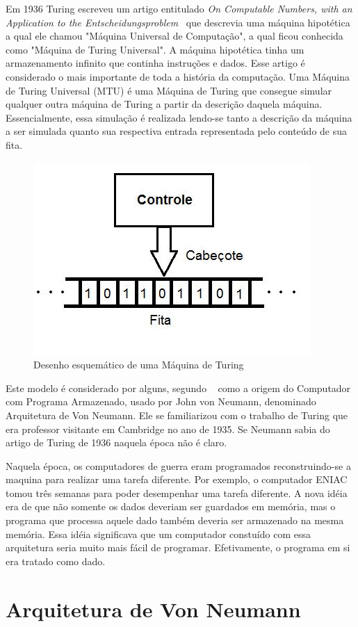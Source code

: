 \documentclass[12pt]{article}
\begin{document}
Em 1936 Turing escreveu um artigo entitulado \emph{On Computable Numbers, with an Application to the Entscheidungsproblem}~\cite{Turing1936} que descrevia uma máquina hipotética a qual ele chamou "Máquina Universal de Computação", a qual ficou conhecida como  "Máquina de Turing Universal". A máquina hipotética tinha um armazenamento infinito que continha instruções e dados. Esse artigo é considerado o mais importante de toda a história da computação. Uma Máquina de Turing Universal (MTU) é uma Máquina de Turing que consegue simular qualquer outra máquina de Turing a partir da descrição daquela máquina. Essencialmente, essa simulação é realizada lendo-se tanto a descrição da máquina a ser simulada quanto sua respectiva entrada representada pelo conteúdo de sua fita. 

\begin{figure}[!ht]
\centering
\includegraphics[width=.5\textwidth]{fig1.jpg}
\caption{Desenho esquemático de uma Máquina de Turing}
\label{fig:exampleFig1}
\end{figure}

Este modelo é considerado por alguns, segundo ~\cite{davis2001} como a origem do Computador com Programa Armazenado, usado por John von Neumann, denominado Arquitetura de Von Neumann. Ele se familiarizou com o trabalho de Turing que era professor visitante em Cambridge no ano de 1935. Se Neumann sabia do artigo de Turing de 1936 naquela época não é claro.

Naquela época, os computadores de guerra eram programados reconstruindo-se a maquina para realizar uma tarefa diferente. Por exemplo, o computador ENIAC tomou três semanas para poder desempenhar uma tarefa diferente. A nova idéia era de que não somente os dados deveriam ser guardados em memória, mas o programa que processa aquele dado também deveria ser armazenado na mesma memória. Essa idéia significava que um computador constuído com essa arquitetura seria muito mais fácil de programar. Efetivamente, o programa em si era tratado como dado.

\section{ Arquitetura de Von Neumann}
\end{document}
